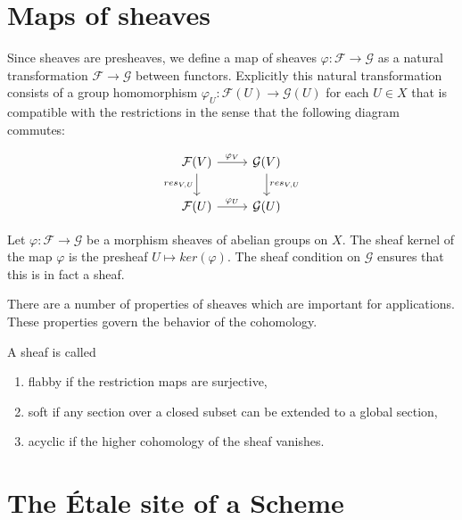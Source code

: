 \section{Maps of sheaves}
Since sheaves are presheaves, we define a map of sheaves $\varphi: \mathcal{F} \to \mathcal{G}$ as a natural transformation $\mathcal{F} \to \mathcal{G}$ between functors. Explicitly this natural transformation consists of a group homomorphism $\varphi_U: \mathcal{F}(U) \to \mathcal{G}(U)$ for each $U \in X$ that is compatible with the restrictions in the sense that the following diagram commutes:

\[\begin{tikzcd}
	{\mathcal{F}(V)} & {\mathcal{G}(V)} \\
	{\mathcal{F}(U)} & {\mathcal{G}(U)}
	\arrow["{res_{V,U}}"', from=1-1, to=2-1]
	\arrow["{\varphi_V}", from=1-1, to=1-2]
	\arrow["{res_{V,U}}", from=1-2, to=2-2]
	\arrow["{\varphi_U}", from=2-1, to=2-2]
\end{tikzcd}\]

Let $\varphi : \mathcal{F} \to \mathcal{G}$ be a morphism sheaves of abelian groups on $X$. The sheaf kernel of the map $\varphi$ is the presheaf $U \mapsto ker(\varphi)$. The sheaf condition on $\mathcal{G}$ ensures that this is in fact a sheaf.



There are a number of properties of sheaves which are important for applications. These properties govern the behavior of the cohomology.

\begin{definition}
  A sheaf is called
  \begin{enumerate}
    \item flabby if the restriction maps are surjective,
    \item soft if any section over a closed subset can be extended to a global section,
    \item acyclic if the higher cohomology of the sheaf vanishes. 
  \end{enumerate} 
\end{definition}

\section{The \'Etale site of a Scheme}
